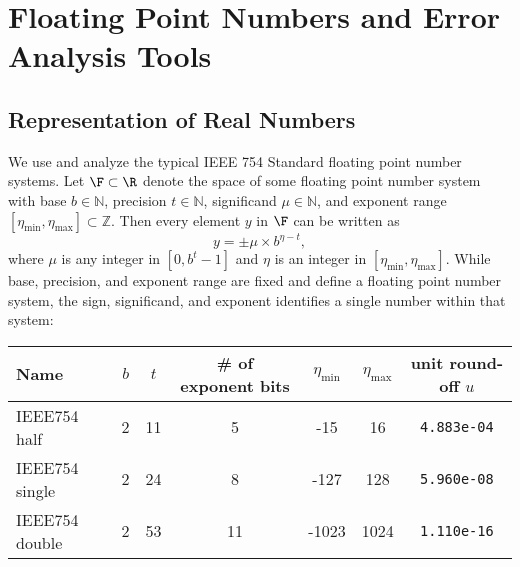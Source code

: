 \section{Floating Point Numbers and Error Analysis Tools}\label{sec:FPREA}

\subsection{Representation of Real Numbers}

We use and analyze the typical IEEE 754 Standard floating point number systems.
Let $\F \subset \R$ denote the space of some floating point number system with base $b\in\mathbb{N}$, precision $t\in\mathbb{N}$, significand $\mu\in\mathbb{N}$, and exponent range $[\eta_{\text{min}}, \eta_{\text{max}}]\subset \mathbb{Z}$.
Then every element $y$ in $\F$ can be written as 
\begin{equation}
y = \pm \mu\times b^{\eta-t}, %
\label{eqn:FPbasic}
\end{equation} 
where $\mu$ is any integer in $[0,b^{t}-1]$ and $\eta$ is an integer in  $[\eta_{\text{min}}, \eta_{\text{max}}]$.
While base, precision, and exponent range are fixed and define a floating point number system, the sign, significand, and exponent identifies a single number within that system:

\vspace{.2cm}
\begin{center}
	\begin{tabular}{||l|c|c|c|c|c|c||} 
		\hline 
		Name & $b$ & $t$ & \# of exponent bits & $\eta_{\text{min}}$ & $\eta_{\text{max}}$ & unit round-off $u$ \\ \hline 
		IEEE754 half & 2 & 11 & 5 & -15 & 16  & {\tt 4.883e-04} \\ \hline 
		IEEE754 single & 2 & 24 & 8 & -127 & 128  & {\tt 5.960e-08} \\ \hline 
		IEEE754 double& 2 & 53 & 11 & -1023 & 1024 & {\tt 1.110e-16} \\ \hline 
	\end{tabular}
\end{center}
\vspace{.2cm}

